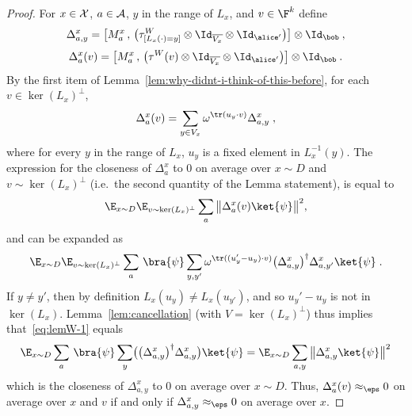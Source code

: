 \begin{proof}
  For $x\in \cal{X}$, $a\in \cal{A}$, $y$ in the range of $L_x$, and $v\in \F^k$
  define
  \begin{equation*}
    \Delta^x_{a,y} = \big[ M^x_a \,,\, \big(\tau^W_{[L_x(\cdot)=y]} \otimes
    \Id_{\overline{V_x}} \otimes \Id_{\alice'}\big) \big]\otimes \Id_\bob\:,
  \end{equation*}
  \begin{equation*}
    \Delta^x_a(v) = \big[ M^x_a \,,\, \big( \tau^W(v) \otimes
    \Id_{\overline{V_x}} \otimes \Id_{\alice'} \big) \big]  \otimes \Id_\bob\:.
  \end{equation*}
  By the first item of Lemma~\ref{lem:why-didnt-i-think-of-this-before}, for
  each $v \in \ker(L_x)^\perp$,
  \begin{equation*}
    \Delta^x_a(v) = \sum_{y \in V_x} \omega^{\tr(u_y \cdot v)} \Delta^x_{a,y}\;,
  \end{equation*}
	where for every $y$ in the range of $L_x$, $u_y$ is a fixed element in
  $L_x^{-1}(y)$.
  The expression for the closeness of $\Delta^x_a$ to $0$ on average over $x
  \sim D$ and $v \sim \ker(L_x)^\perp$ (i.e.\ the second quantity of the Lemma
  statement), is equal to
  \begin{equation*}
    \E_{x\sim D} \E_{v \sim \ker(L_x)^\perp} \sum_a\, \bigl \| \Delta^x_a (v)
  \ket{\psi}\bigr \|^2,
  \end{equation*}
  and can be expanded as
  \begin{equation}\label{eq:lemW-1}
    \E_{x\sim D} \E_{v \sim \ker(L_x)^\perp} \sum_a\, \bra{\psi} \sum_{y,y'}
    \omega^{\tr ((u_y'-u_y) \cdot v)} \bigl( \Delta^x_{a,y} \bigr)^\dagger
    \Delta^x_{a,y'} \ket{\psi}\;.
  \end{equation}
  If $y \neq y'$, then by definition $L_x(u_y) \neq L_x(u_{y'})$, and so $u_y' -
  u_y$ is not in $\ker(L_x)$.
  Lemma~\ref{lem:cancellation} (with $V = \ker(L_x)^\perp$) thus implies
  that~\eqref{eq:lemW-1} equals
  \begin{equation*}
    \E_{x\sim D} \sum_a\, \bra{\psi} \sum_{y} \bigl( \bigl( \Delta^x_{a,y}
    \bigr)^\dagger \Delta^x_{a,y} \bigr) \ket{\psi} = \E_{x\sim D} \sum_{a, y}
    \, \bigl \|\Delta^x_{a,y} \ket{\psi} \bigr \|^2
  \end{equation*}
  which is the closeness of $\Delta^x_{a,y}$ to $0$ on average over $x \sim D$.
  Thus, $\Delta^x_a(v) \approx_\eps 0$ on average over $x$ and $v$ if and only
  if $\Delta^x_{a,y} \approx_\eps 0$ on average over $x$.
\end{proof}

